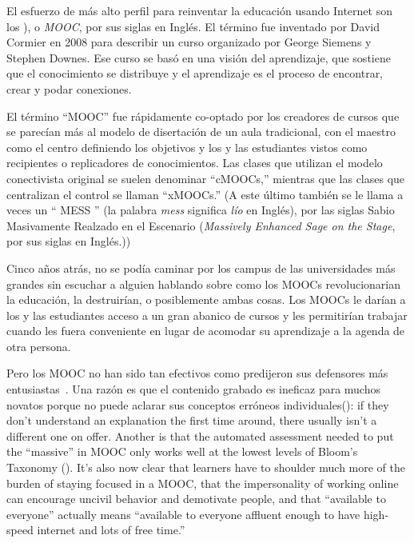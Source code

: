 
El esfuerzo de más alto perfil para reinventar la educación usando Internet
son los ), o \emph{MOOC}, por sus siglas en Inglés.
El término fue inventado por David Cormier en 2008
para describir un curso organizado por George Siemens
y Stephen Downes.
Ese curso se basó en una visión  del aprendizaje,
que sostiene que el conocimiento se distribuye
y el aprendizaje es el proceso de encontrar, crear y podar conexiones.

El término ``MOOC'' fue rápidamente co-optado por los creadores de
cursos que se parecían más al modelo de disertación de un aula tradicional,
con el maestro como el centro definiendo los objetivos
y los y las estudiantes vistos como recipientes o replicadores de conocimientos.
Las clases que utilizan el modelo conectivista original se suelen denominar ``cMOOCs,''
mientras que las clases que centralizan el control se llaman ``xMOOCs.''
(A este último también se le llama a veces un `` MESS '' (la palabra \emph{mess} significa \emph{lío} en Inglés),
por las siglas Sabio Masivamente Realzado en el Escenario (\emph{Massively Enhanced Sage on the Stage}, por sus siglas en Inglés.))

Cinco años atrás,
no se podía caminar por los campus de las universidades más grandes
sin escuchar a alguien hablando sobre como los MOOCs revolucionarian la educación,
la destruirían, 
o posiblemente ambas cosas.
Los MOOCs le darían a los y las estudiantes acceso a un gran abanico de cursos
y les permitirían trabajar cuando les fuera conveniente
en lugar de acomodar su aprendizaje a la agenda de otra persona.

Pero los MOOC no han sido tan efectivos
como predijeron sus defensores más entusiastas~\cite{Ubel2017}.
Una razón es que
el contenido grabado es ineficaz para muchos novatos
porque no puede aclarar sus conceptos erróneos individuales():
if they don't understand an explanation the first time around,
there usually isn't a different one on offer.
Another is that the automated assessment needed to put the ``massive'' in MOOC
only works well at the lowest levels of Bloom's Taxonomy ().
It's also now clear that
learners have to shoulder much more of the burden of staying focused in a MOOC,
that the impersonality of working online can encourage uncivil behavior and demotivate people,
and that ``available to everyone'' actually means
``available to everyone affluent enough to have high-speed internet and lots of free time.''

